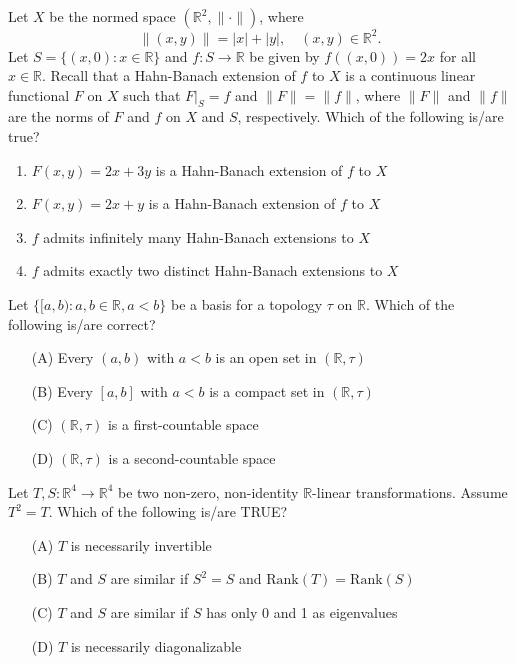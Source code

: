     \item Let $X$ be the normed space $(\mathbb{R}^2, \|\cdot\|)$, where
    \[
    \|(x, y)\| = |x| + |y|, \quad (x, y) \in \mathbb{R}^2.
    \]
    Let $S = \{(x, 0) : x \in \mathbb{R}\}$ and $f : S \rightarrow \mathbb{R}$ be given by $f((x, 0)) = 2x$ for all $x \in \mathbb{R}$. Recall that a Hahn-Banach extension of $f$ to $X$ is a continuous linear functional $F$ on $X$ such that $F|_S = f$ and $\|F\| = \|f\|$, where $\|F\|$ and $\|f\|$ are the norms of $F$ and $f$ on $X$ and $S$, respectively. Which of the following is/are true?
    \begin{enumerate}
        \item $F(x, y) = 2x + 3y$ is a Hahn-Banach extension of $f$ to $X$
        \item $F(x, y) = 2x + y$ is a Hahn-Banach extension of $f$ to $X$
        \item $f$ admits infinitely many Hahn-Banach extensions to $X$
        \item $f$ admits exactly two distinct Hahn-Banach extensions to $X$
    \end{enumerate}

    \bigskip

    \item Let $\{[a, b) : a, b \in \mathbb{R}, a < b\}$ be a basis for a topology $\tau$ on $\mathbb{R}$. Which of the following is/are correct?
    \begin{enumerate}
        \item[(A)] Every $(a, b)$ with $a < b$ is an open set in $(\mathbb{R}, \tau)$
        \item[(B)] Every $[a, b]$ with $a < b$ is a compact set in $(\mathbb{R}, \tau)$
        \item[(C)] $(\mathbb{R}, \tau)$ is a first-countable space
        \item[(D)] $(\mathbb{R}, \tau)$ is a second-countable space
    \end{enumerate}
    \bigskip
    \item Let $T, S : \mathbb{R}^4 \rightarrow \mathbb{R}^4$ be two non-zero, non-identity $\mathbb{R}$-linear transformations. Assume $T^2 = T$. Which of the following is/are TRUE?
    \begin{enumerate}
        \item[(A)] $T$ is necessarily invertible
        \item[(B)] $T$ and $S$ are similar if $S^2 = S$ and $\text{Rank}(T) = \text{Rank}(S)$
        \item[(C)] $T$ and $S$ are similar if $S$ has only 0 and 1 as eigenvalues
        \item[(D)] $T$ is necessarily diagonalizable
    \end{enumerate}

